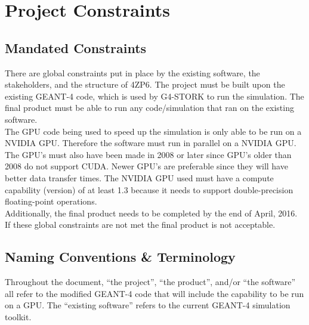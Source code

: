 \documentclass[12pt]{article}
\newcommand{\todo}[1]{\textcolor{red}{[TODO: #1]}} \else
\newcommand{\authornote}[3]{} \newcommand{\todo}[1]{} \fi
\newcommand{\ds}[1]{\authornote{blue}{DS}{#1}} %
\newcommand{\mmp}[1]{\authornote{green}{MP}{#1}}
\begin{document}
\section{Project Constraints}

\subsection{Mandated Constraints} %
There are global constraints put in place by the existing software, the stakeholders, and the structure of 4ZP6. The project must be built upon the existing GEANT-4 code, which is used by G4-STORK to run the simulation. The final product must be able to run any code/simulation that ran on the existing software.\\ 
The GPU code being used to speed up the simulation is only able to be run on a NVIDIA GPU. Therefore the software must run in parallel on a NVIDIA GPU. The GPU's must also have been made in 2008 or later since GPU's older than 2008 do not support CUDA. Newer GPU's are preferable since they will have better data transfer times. The NVIDIA GPU used must have a compute capability (version) of at least 1.3 because it needs to support double-precision floating-point operations.\\
Additionally, the final product needs to be completed by the end of April, 2016. If these global constraints are not met the final product is not acceptable.\\



\ds{Why an NVIDIA GPU? Was that constrained by your client?}\mmp{Added an explanation for why we are constrained to using an NVIDIA GPU}
\subsection{Naming Conventions \& Terminology} %
Throughout the document, ``the project'', ``the product'', and/or ``the software'' all refer to the modified GEANT-4 code that will include the capability to be run on a GPU. The ``existing software'' refers to the current GEANT-4 simulation toolkit.\\

\newpage %
\end{document}
